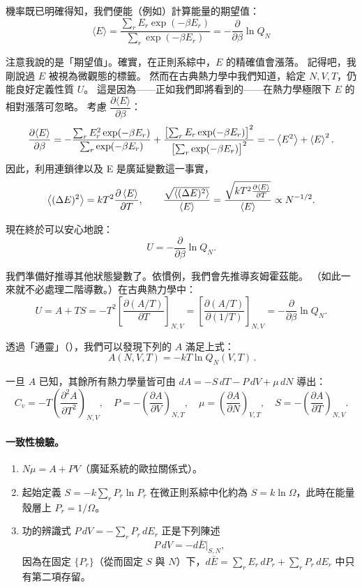 機率既已明確得知，我們便能（例如）計算能量的期望值：
\[
    \langle E \rangle = \frac{\sum_r E_r\exp(-\beta E_r)}{\sum_r \exp(-\beta E_r)}
    = -\frac{\partial}{\partial\beta}\ln Q_N
\]

注意我說的是「期望值」。確實，在正則系綜中，$E$ 的精確值會漲落。
記得吧，我剛說過 $E$ 被視為微觀態的標籤。
然而在古典熱力學中我們知道，給定 $N, V, T$，仍能良好定義性質 $U$。
這是因為——正如我們即將看到的——在熱力學極限下 $E$ 的相對漲落可忽略。
考慮 $\dfrac{\partial \langle E \rangle}{\partial\beta}$：
\[
    \frac{\partial \langle E \rangle}{\partial\beta}
    = -\frac{\sum_r E_r^{2}\exp(-\beta E_r)}{\sum_r \exp(-\beta E_r)}
    + \frac{\bigl[\sum_r E_r\exp(-\beta E_r)\bigr]^{2}}{\bigl[\sum_r\exp(-\beta E_r)\bigr]^{2}}
    = -\left\langle E^{2} \right\rangle + \left\langle E \right\rangle^{2}.
\]
因此，利用連鎖律以及 E 是廣延變數這一事實，
\[
    \left\langle (\Delta E)^{2} \right\rangle = kT^{2} \frac{\partial \left\langle E \right\rangle}{\partial T} ,\qquad
    \frac{\sqrt{\left\langle (\Delta E)^{2} \right\rangle}}{\left\langle E \right\rangle} = \frac{\sqrt{kT^{2} \frac{\partial \left\langle E \right\rangle}{\partial T}}}{\left\langle E \right\rangle} \propto N^{-1/2}.
\]

現在終於可以安心地說：
\[
    U = -\frac{\partial}{\partial\beta}\ln Q_N.
\]

我們準備好推導其他狀態變數了。依慣例，我們會先推導亥姆霍茲能。
（如此一來就不必處理二階導數。）在古典熱力學中：
\[
    U = A + TS = -T^{2}\!\left[\frac{\partial(A/T)}{\partial T}\right]_{N,V}
    = \left[\frac{\partial(A/T)}{\partial(1/T)}\right]_{N,V} = -\frac{\partial}{\partial\beta}\ln Q_N.
\]

透過「通靈」（），我們可以發現下列的 $A$ 滿足上式：
\[
    \boxed{\,A(N,V,T) = -kT\ln Q_N(V,T)\,}.
\]

一旦 $A$ 已知，其餘所有熱力學量皆可由 $dA = -S\,dT - P\,dV + \mu\,dN$ 導出：
\[
    C_v = -T\!\left(\frac{\partial^{2} A}{\partial T^{2}}\right)_{N,V},\quad
    P = -\!\left(\frac{\partial A}{\partial V}\right)_{N,T},\quad
    \mu = \!\left(\frac{\partial A}{\partial N}\right)_{V,T},\quad
    S = -\!\left(\frac{\partial A}{\partial T}\right)_{N,V}.
\]

\paragraph{一致性檢驗。}
\begin{enumerate}[label=(\arabic*)]
    \item $N\mu = A + PV$（廣延系統的歐拉關係式）。
    \item 起始定義 $S = -k\sum_r P_r\ln P_r$ 在微正則系綜中化約為 $S = k\ln\Omega$，此時在能量殼層上 $P_r = 1/\Omega$。
    \item 功的辨識式 $P\,dV = -\sum_r P_r\,dE_r$ 正是下列陳述
    \[
        P\,dV = -d\bar E\big|_{S,N},
    \]
    因為在固定 $\{P_r\}$（從而固定 $S$ 與 $N$）下，$d\bar E = \sum_r E_r\,dP_r + \sum_r P_r\,dE_r$ 中只有第二項存留。
\end{enumerate}
